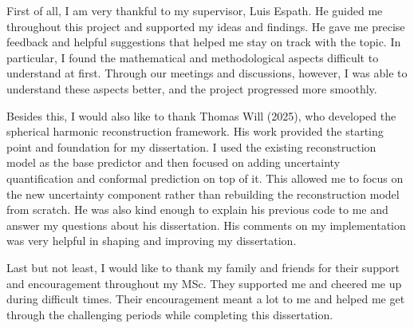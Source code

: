 
First of all, I am very thankful to my supervisor, Luis Espath. He guided me throughout this project and supported my ideas and findings. He gave me precise feedback and helpful suggestions that helped me stay on track with the topic. In particular, I found the mathematical and methodological aspects difficult to understand at first. Through our meetings and discussions, however, I was able to understand these aspects better, and the project progressed more smoothly.

Besides this, I would also like to thank Thomas Will (2025), who developed the spherical harmonic reconstruction framework. His work provided the starting point and foundation for my dissertation. I used the existing reconstruction model as the base predictor and then focused on adding uncertainty quantification and conformal prediction on top of it. This allowed me to focus on the new uncertainty component rather than rebuilding the reconstruction model from scratch. He was also kind enough to explain his previous code to me and answer my questions about his dissertation. His comments on my implementation was very helpful in shaping and improving my dissertation.

Last but not least, I would like to thank my family and friends for their support and encouragement throughout my MSc. They supported me and cheered me up during difficult times. Their encouragement meant a lot to me and helped me get through the challenging periods while completing this dissertation.

